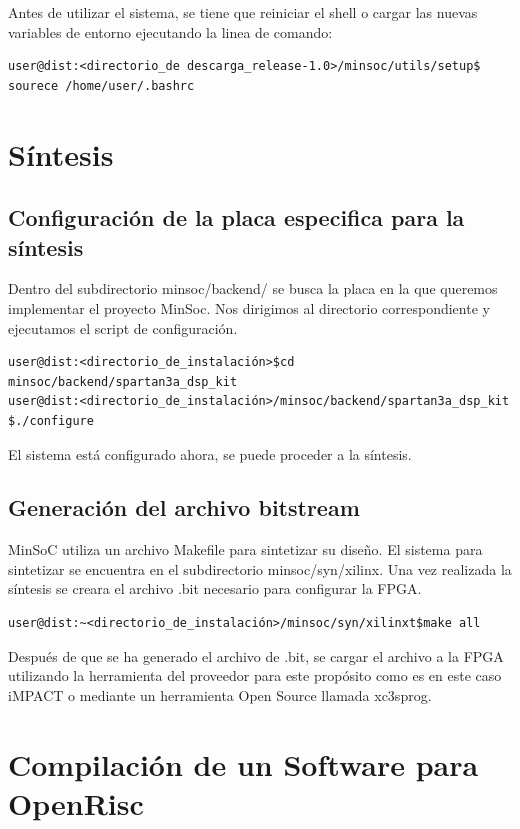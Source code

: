 Antes de utilizar el sistema, se tiene que reiniciar el shell o cargar las nuevas variables de entorno ejecutando la linea de comando:

\begin{lstlisting}[breaklines]
user@dist:<directorio_de descarga_release-1.0>/minsoc/utils/setup$ sourece /home/user/.bashrc
\end{lstlisting}

\section{Síntesis}

\subsection{Configuración de la placa especifica para la síntesis}
Dentro del subdirectorio minsoc/backend/ se busca la placa en la que queremos implementar el proyecto MinSoc. Nos dirigimos al directorio correspondiente y ejecutamos el script de configuración.

\begin{lstlisting}[breaklines]
user@dist:<directorio_de_instalación>$cd minsoc/backend/spartan3a_dsp_kit 
user@dist:<directorio_de_instalación>/minsoc/backend/spartan3a_dsp_kit $./configure 
\end{lstlisting}

El sistema está configurado ahora, se puede proceder a la síntesis.

\subsection{Generación del archivo bitstream}

MinSoC utiliza un archivo Makefile para sintetizar su diseño. El sistema para sintetizar se encuentra en el subdirectorio minsoc/syn/xilinx. Una vez realizada la síntesis se creara el archivo .bit necesario para configurar la FPGA.

\begin{lstlisting}[breaklines]
user@dist:~<directorio_de_instalación>/minsoc/syn/xilinxt$make all
\end{lstlisting}

Después de que se ha generado el archivo de .bit, se cargar el archivo a la FPGA utilizando la herramienta del proveedor para este propósito como es en este caso iMPACT o mediante un herramienta Open Source llamada xc3sprog. 

\section{Compilación de un Software para OpenRisc}

